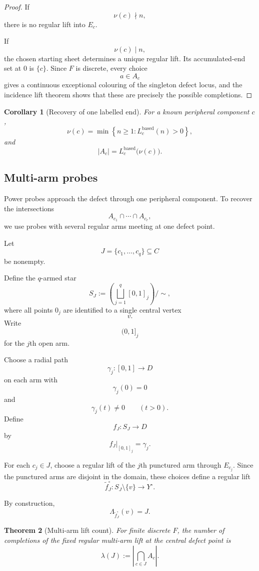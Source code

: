 \documentclass[11pt]{article}
\theoremstyle{plain}
\newtheorem{theorem}{Theorem}[section]
\newtheorem{corollary}[theorem]{Corollary}
\theoremstyle{definition}
\begin{document}
\begin{proof}
If
\[
\nu(c)\nmid n,
\]
there is no regular lift into $E_c$.

If
\[
\nu(c)\mid n,
\]
the chosen starting sheet determines a unique regular lift.  Its
accumulated-end set at $0$ is $\{c\}$.  Since $F$ is discrete, every
choice
\[
a\in A_c
\]
gives a continuous exceptional colouring of the singleton defect locus,
and the incidence lift theorem shows that these are precisely the
possible completions.
\end{proof}


\begin{corollary}[Recovery of one labelled end]
\label{cor:recover-labelled-end}
For a known peripheral component $c$,
\[
\nu(c)
=
\min
\left\{
n\geq1:
L_c^{\mathrm{based}}(n)>0
\right\},
\]
and
\[
|A_c|
=
L_c^{\mathrm{based}}\bigl(\nu(c)\bigr).
\]
\end{corollary}


\subsection{Multi-arm probes}
\label{subsec:multi-arm-probes}

Power probes approach the defect through one peripheral component.
To recover the intersections
\[
A_{c_1}\cap\cdots\cap A_{c_r},
\]
we use probes with several regular arms meeting at one defect point.

Let
\[
J=\{c_1,\ldots,c_q\}
\subseteq C
\]
be nonempty.

Define the $q$-armed star
\[
S_J
:=
\left(
\bigsqcup_{j=1}^q[0,1]_j
\right)\big/\!\sim,
\]
where all points $0_j$ are identified to a single central vertex
\[
v.
\]
Write
\[
(0,1]_j
\]
for the $j$th open arm.

Choose a radial path
\[
\gamma_j:[0,1]\to D
\]
on each arm with
\[
\gamma_j(0)=0
\]
and
\[
\gamma_j(t)\neq0
\qquad(t>0).
\]
Define
\[
f_J:S_J\longrightarrow D
\]
by
\[
f_J|_{[0,1]_j}=\gamma_j.
\]

For each $c_j\in J$, choose a regular lift of the $j$th punctured arm
through $E_{c_j}$.  Since the punctured arms are disjoint in the domain,
these choices define a regular lift
\[
\widetilde f_J^\circ:
S_J\setminus\{v\}
\longrightarrow
Y^\circ.
\]

By construction,
\[
\Lambda_{\widetilde f_J^\circ}(v)=J.
\]

\begin{theorem}[Multi-arm lift count]
\label{thm:multi-arm-lift-count}
For finite discrete $F$, the number of completions of the fixed regular
multi-arm lift at the central defect point is
\[
\lambda(J)
:=
\left|
\bigcap_{c\in J}A_c
\right|.
\]
\end{theorem}
\end{document}
